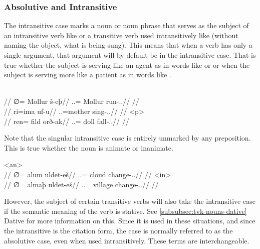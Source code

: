 \subsubsection{Absolutive and Intransitive}
\label{subsubsec:tvk-nouns-absolutive}

The intransitive case marks a noun or noun phrase that serves as the subject of an intransitive verb like   or a transitive verb used intransitively like   (without naming the object, what is being sung). This means that when a verb has only a single argument, that argument will by default be in the intransitive case. That is true whether the subject is serving like an agent as in words like   or   or when the subject is serving more like a patient as in words like  .

	\begingl
		\glpreamble{}\\
		//
		\gla ∅= Mollur š-eþ//
		\glb \An.\Sg.\Intr= Mollur run-\Ind.\Npst.\Prg//
		\glft{}//
	\endgl
	\a<a2>\begingl
		\glpreamble{}\\
		//
		\gla ri=ima uf-u//
		\glb \An.\Pc.\Intr=mother sing-\Ind.\Npst.\Ipfv//
		\glft{}//
	\endgl
	\begingl
		\glpreamble{}\\
		//
		\gla ren= fild orð-ak//
		\glb \In.\Pl.\Intr= doll fall-\Ind.\Pst.\Pfv//
		\glft{}//
	\endgl
\xe

Note that the singular intransitive case is entirely unmarked by any preposition. This is true whether the noun is animate or inanimate.

	\a<an>\begingl
		\glpreamble{}\\
		//
		\gla ∅= alum uldet-eš//
		\glb \An.\Sg.\Intr= cloud change-\Ind.\Npst.\Rtsp//
		\glft{}//
	\endgl
	\a<in>\begingl
		\glpreamble{}\\
		//
		\gla ∅= almaþ uldet-eš//
		\glb \In.\Sg.\Intr= village change-\Ind.\Npst.\Rtsp//
		\glft{}//
	\endgl
\xe

However, the subject of certain transitive verbs will also take the intransitive case if the semantic meaning of the verb is stative. See \autoref{subsubsec:tvk-nouns-dative} Dative for more information on this. Since it is used in these situations, and since the intransitive is the citation form, the case is normally referred to as the absolutive case, even when used intransitively. These terms are interchangeable.

